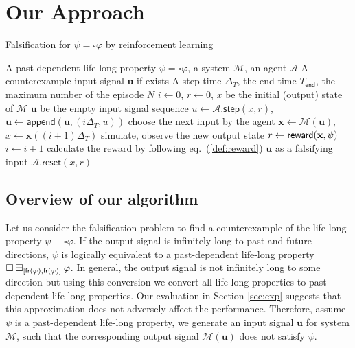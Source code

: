 \section{Our Approach}\label{sec:overview}

\begin{algorithm}[tp]
\scriptsize
  \caption{Falsification for $\psi = \square \varphi$ by reinforcement learning}
  \label{algo:RLfalsification}
  \begin{algorithmic}[1]
    \INPUT A past-dependent life-long property $\psi = \square \varphi$, a system $\mathcal{M}$,
    an agent $\mathcal{A}$
    \OUTPUT A counterexample input signal $\mathbf{u}$ if exists
    \PARAMETERS A step time $\Delta_T$, the end time $T_{\mathsf{end}}$, the maximum number of the episode $N$
    \State $i \gets 0$, $r \gets 0$, $x$ be the initial (output) state of $\mathcal{M}$
    \State $\mathbf{u}$ be the empty input signal sequence
    \State $u \gets \mathcal{A}.\mathsf{step}(x, r)$,  $\mathbf{u} \gets \mathsf{append}(\mathbf{u}, (i \Delta_T, u))$
    \Comment choose the next input by the agent
    \State $\mathbf{x} \gets \mathcal{M}(\mathbf{u})$, $x \gets \mathbf{x}((i+1)\Delta_T)$
    \Comment simulate, observe the new output state
    \State $r \gets \operatorname{\mathsf{reward}}(\mathbf{x}, \psi)$
    \State $i \gets i+1$
    \Comment calculate the reward by following eq.~(\ref{def:reward})
    \EndWhile
    \Return $\mathbf{u}$ as a falsifying input
    \EndIf
    \State $\mathcal{A}.\mathsf{reset}(x, r)$
    \EndFor
   \end{algorithmic}
\end{algorithm}
%

\subsection{Overview of our algorithm}\label{subsec:algorithm}
Let us consider the falsification problem to find a counterexample of the life-long property $\psi \equiv \square \varphi$.
If the output signal is infinitely long to past and future directions, $\psi$ is logically equivalent to a past-dependent life-long property $\square \boxminus_{[\operatorname{\mathsf{fr}}(\varphi), \operatorname{\mathsf{fr}}(\varphi)]} \varphi$.
In general, the output signal is not infinitely long to some direction but using this conversion we convert all life-long properties to past-dependent life-long properties.
Our evaluation in Section \ref{sec:exp} suggests that this approximation does not adversely affect the performance.
%
Therefore, assume $\psi$ is a past-dependent life-long property, we generate an input signal $\mathbf{u}$ for system $\mathcal{M}$,
such that the corresponding output signal $\mathcal{M}(\mathbf{u})$ does not satisfy $\psi$.

